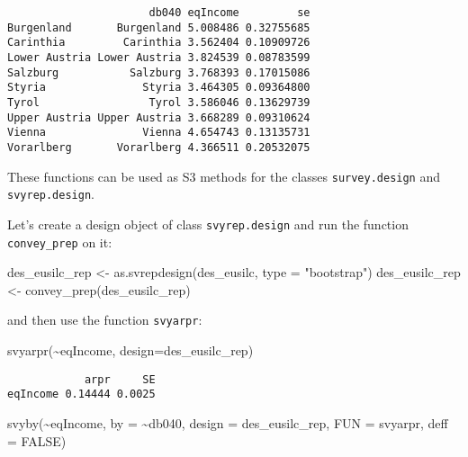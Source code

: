 \documentclass[
]{book}
\newenvironment{Shaded}{\begin{snugshade}}{\end{snugshade}}
\newcommand{\AttributeTok}[1]{\textcolor[rgb]{0.77,0.63,0.00}{#1}}
\newcommand{\ConstantTok}[1]{\textcolor[rgb]{0.00,0.00,0.00}{#1}}
\newcommand{\FunctionTok}[1]{\textcolor[rgb]{0.00,0.00,0.00}{#1}}
\newcommand{\NormalTok}[1]{#1}
\newcommand{\OtherTok}[1]{\textcolor[rgb]{0.56,0.35,0.01}{#1}}
\newcommand{\SpecialCharTok}[1]{\textcolor[rgb]{0.00,0.00,0.00}{#1}}
\newcommand{\StringTok}[1]{\textcolor[rgb]{0.31,0.60,0.02}{#1}}
\begin{document}
\begin{verbatim}
                      db040 eqIncome         se
Burgenland       Burgenland 5.008486 0.32755685
Carinthia         Carinthia 3.562404 0.10909726
Lower Austria Lower Austria 3.824539 0.08783599
Salzburg           Salzburg 3.768393 0.17015086
Styria               Styria 3.464305 0.09364800
Tyrol                 Tyrol 3.586046 0.13629739
Upper Austria Upper Austria 3.668289 0.09310624
Vienna               Vienna 4.654743 0.13135731
Vorarlberg       Vorarlberg 4.366511 0.20532075
\end{verbatim}

These functions can be used as S3 methods for the classes \texttt{survey.design} and \texttt{svyrep.design}.

Let's create a design object of class \texttt{svyrep.design} and run the function \texttt{convey\_prep} on it:

\begin{Shaded}
\begin{Highlighting}[]
\NormalTok{des\_eusilc\_rep }\OtherTok{\textless{}{-}} \FunctionTok{as.svrepdesign}\NormalTok{(des\_eusilc, }\AttributeTok{type =} \StringTok{"bootstrap"}\NormalTok{)}
\NormalTok{des\_eusilc\_rep }\OtherTok{\textless{}{-}} \FunctionTok{convey\_prep}\NormalTok{(des\_eusilc\_rep) }
\end{Highlighting}
\end{Shaded}

and then use the function \texttt{svyarpr}:

\begin{Shaded}
\begin{Highlighting}[]
\FunctionTok{svyarpr}\NormalTok{(}\SpecialCharTok{\textasciitilde{}}\NormalTok{eqIncome, }\AttributeTok{design=}\NormalTok{des\_eusilc\_rep)}
\end{Highlighting}
\end{Shaded}

\begin{verbatim}
            arpr     SE
eqIncome 0.14444 0.0025
\end{verbatim}

\begin{Shaded}
\begin{Highlighting}[]
\FunctionTok{svyby}\NormalTok{(}\SpecialCharTok{\textasciitilde{}}\NormalTok{eqIncome, }\AttributeTok{by =} \SpecialCharTok{\textasciitilde{}}\NormalTok{db040, }\AttributeTok{design =}\NormalTok{ des\_eusilc\_rep, }\AttributeTok{FUN =}\NormalTok{ svyarpr, }\AttributeTok{deff =} \ConstantTok{FALSE}\NormalTok{)}
\end{Highlighting}
\end{Shaded}
\end{document}
